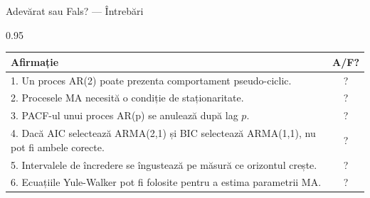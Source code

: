 \documentclass[9pt, aspectratio=169, t]{beamer}
\begin{document}
\begin{frame}{Adevărat sau Fals? --- Întrebări}
    \begin{cminipage}{0.95\textwidth}
    \footnotesize
    \begin{center}
    \begin{tabular}{p{9cm}c}
        \toprule
        \textbf{Afirmație} & \textbf{A/F?} \\
        \midrule
        1. Un proces AR(2) poate prezenta comportament pseudo-ciclic. & ? \\[0.15cm]
        2. Procesele MA necesită o condiție de staționaritate. & ? \\[0.15cm]
        3. PACF-ul unui proces AR(p) se anulează după lag $p$. & ? \\[0.15cm]
        4. Dacă AIC selectează ARMA(2,1) și BIC selectează ARMA(1,1), nu pot fi ambele corecte. & ? \\[0.15cm]
        5. Intervalele de încredere se îngustează pe măsură ce orizontul crește. & ? \\[0.15cm]
        6. Ecuațiile Yule-Walker pot fi folosite pentru a estima parametrii MA. & ? \\
        \bottomrule
    \end{tabular}
    \end{center}
    \end{cminipage}
\end{frame}
\end{document}
